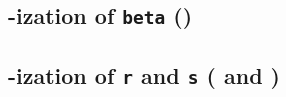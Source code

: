 \subsection{\rlp{}-ization of \texttt{beta} (\phaseBeta)}                                         \label{rlp txn v2: phase constraints: beta}           
\subsection{\rlp{}-ization of \texttt{r} and \texttt{s} (\phaseR{} and \phaseS)}                  \label{rlp txn v2: phase constraints: r and s}        

